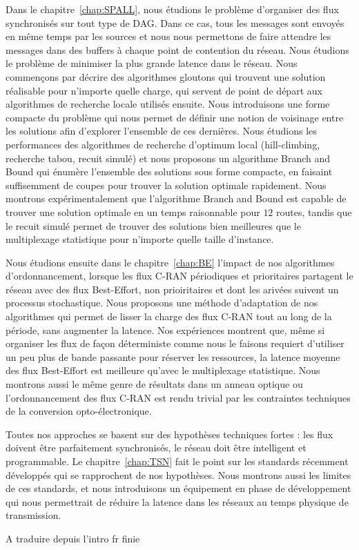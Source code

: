 Dans le chapitre~\ref{chap:SPALL}, nous étudions le problème d'organiser des flux synchronisés sur tout type de DAG. Dans ce cas, tous les messages sont envoyés en même temps par les sources et nous nous permettons de faire attendre les messages dans des buffers à chaque point de contention du réseau. Nous étudions le problème de minimiser la plus grande latence dans le réseau. Nous commençons par décrire des algorithmes gloutons qui trouvent une solution réalisable pour n'importe quelle charge, qui servent de point de départ aux algorithmes de recherche locale utilisés ensuite. Nous introduisons une forme compacte du problème qui nous permet de définir une notion de voisinage entre les solutions afin d'explorer l'ensemble de ces dernières. Nous étudions les performances des algorithmes de recherche d'optimum local (hill-climbing, recherche tabou, recuit simulé) et nous proposons un algorithme Branch and Bound qui énumère l'ensemble des solutions sous forme compacte, en faisaint suffisemment de coupes pour trouver la solution optimale rapidement. Nous montrons expérimentalement que l'algorithme Branch and Bound est capable de trouver une solution optimale en un temps raisonnable pour $12$ routes, tandis que le recuit simulé permet de trouver des solutions bien meilleures que le multiplexage statistique pour n'importe quelle taille d'instance.

Nous étudions ensuite dans le chapitre~\ref{chap:BE} l'impact de nos algorithmes d'ordonnancement, lorsque les flux C-RAN périodiques et prioritaires partagent le réseau avec des flux Best-Effort, non prioiritaires et dont les arivées suivent un processus stochastique. Nous proposons une méthode d'adaptation de nos algorithmes qui permet de lisser la charge des flux C-RAN tout au long de la période, sans augmenter la latence. Nos expériences montrent que, même si organiser les flux de façon déterministe comme nous le faisons requiert d'utiliser un peu plus de bande passante pour réserver les ressources, la latence moyenne des flux Best-Effort est meilleure qu'avec le multiplexage statistique. Nous montrons aussi le même genre de résultats dans un anneau optique ou l'ordonnancement des flux C-RAN est rendu trivial par les contraintes techniques de la conversion opto-électronique.

Toutes nos approches se basent sur des hypothèses techniques fortes : les flux doivent être parfaitement synchronisés, le réseau doit être intelligent et programmable. Le chapitre~\ref{chap:TSN} fait le point sur les standards récemment développés qui se rapprochent de nos hypothèses. Nous montrons aussi les limites de ces standards, et nous introduisons un équipement en phase de développement qui nous permettrait de réduire la latence dans les réseaux au temps physique de transmission.



\label{chap:introen}
A traduire depuis l'intro fr finie